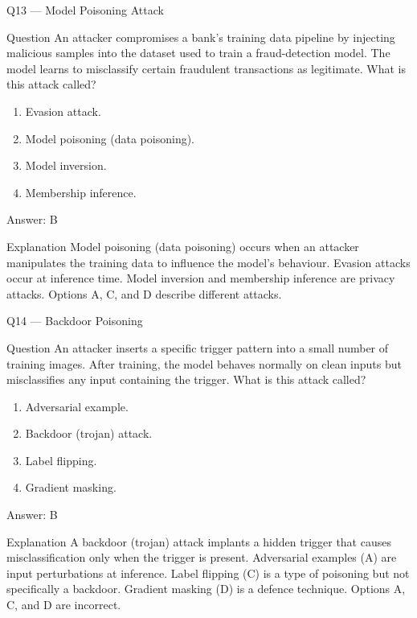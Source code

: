 \documentclass[aspectratio=169,8pt]{beamer}
\begin{document}
	\begin{frame}{Q13 --- Model Poisoning Attack}
		\begin{block}{Question}
			An attacker compromises a bank's training data pipeline by injecting malicious samples into the dataset used to train a fraud-detection model. The model learns to misclassify certain fraudulent transactions as legitimate. What is this attack called?
			\begin{enumerate}
				\item Evasion attack.
				\item Model poisoning (data poisoning).
				\item Model inversion.
				\item Membership inference.
			\end{enumerate}
		\end{block}
		\begin{exampleblock}{Answer: B}\end{exampleblock}
		\begin{block}{Explanation}
			Model poisoning (data poisoning) occurs when an attacker manipulates the training data to influence the model's behaviour. Evasion attacks occur at inference time. Model inversion and membership inference are privacy attacks. Options A, C, and D describe different attacks.
		\end{block}
	\end{frame}
	
	\begin{frame}{Q14 --- Backdoor Poisoning}
		\begin{block}{Question}
			An attacker inserts a specific trigger pattern into a small number of training images. After training, the model behaves normally on clean inputs but misclassifies any input containing the trigger. What is this attack called?
			\begin{enumerate}
				\item Adversarial example.
				\item Backdoor (trojan) attack.
				\item Label flipping.
				\item Gradient masking.
			\end{enumerate}
		\end{block}
		\begin{exampleblock}{Answer: B}\end{exampleblock}
		\begin{block}{Explanation}
			A backdoor (trojan) attack implants a hidden trigger that causes misclassification only when the trigger is present. Adversarial examples (A) are input perturbations at inference. Label flipping (C) is a type of poisoning but not specifically a backdoor. Gradient masking (D) is a defence technique. Options A, C, and D are incorrect.
		\end{block}
	\end{frame}
	
\end{document}

